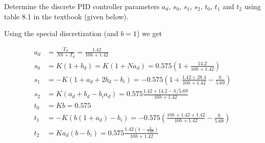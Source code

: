 \documentclass[a4paper]{scrartcl}
\begin{document}
Determine the discrete PID controller parameters $a_d$, $s_0$, $s_1$, $s_2$, $t_0$, $t_1$ and $t_2$ using table 8.1 in the textbook (given below). 

Using the special discretization (and $b=1$) we get

\begin{align*}
  a_d &= \frac{T_d}{Nh + T_d} = \frac{1.42}{10h + 1.42}\\
  s_0 &= K(1 + b_d) = K(1 + Na_d) = 0.575(1 + \frac{14.2}{10h + 1.42})\\
  s_1 &= -K(1 + a_d + 2b_d - b_i) = -0.575( 1 + \frac{1.42 + 28.4}{10h + 1.42} - \frac{h}{5.69})\\
  s_2 &= K(a_d + b_d - b_ia_d) = 0.575\frac{1.42 + 14.2 - h/5.69}{10h + 1.42}\\
  t_0 &= Kb = 0.575\\
  t_1 &= -K(b(1+a_d) - b_i) = -0.575( \frac{10h + 1.42 + 1.42}{10h + 1.42} - \frac{h}{5.69})\\
  t_2 &= Ka_d(b-b_i) = 0.575 \frac{1.42(1-\frac{h}{5.69})}{10h + 1.42}
\end{align*}
\end{document}
